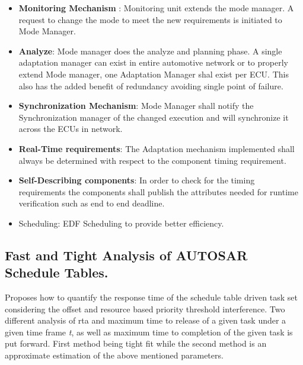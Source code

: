 \begin{minipage}{\linewidth}%
\end{minipage}
\begin{itemize}
	\item \textbf{Monitoring Mechanism} : Monitoring unit extends the mode manager. A request to change the mode to meet the new requirements is initiated to Mode Manager.
	\item \textbf{Analyze}: Mode manager does the analyze and planning phase. A single adaptation manager can exist in entire automotive network or to properly extend Mode manager, one Adaptation Manager shal exist per ECU. This also has the added benefit of redundancy avoiding single point of failure.
	\item \textbf{Synchronization Mechanism}: Mode Manager shall notify the Synchronization manager of the changed execution and will synchronize it across the ECUs in network.
	\item \textbf{Real-Time requirements}: The Adaptation mechanism implemented shall always be determined with respect to the component timing requirement.
	\item \textbf{Self-Describing components}: In order to check for the timing requirements the components shall publish the attributes needed for runtime verification such as end to end deadline.
	\item Scheduling: EDF Scheduling to provide better efficiency.
\end{itemize}
\subsection{Fast and Tight Analysis of AUTOSAR Schedule Tables.}
Proposes how to quantify the response time of the schedule table driven task set considering the offset and resource based priority threshold interference.
Two different analysis of rta and maximum time to release of a given task under a given time frame \textit{t}, as well as maximum time to completion of the given task is put forward.
First method being tight fit while the second method is an approximate estimation of the above mentioned parameters.

